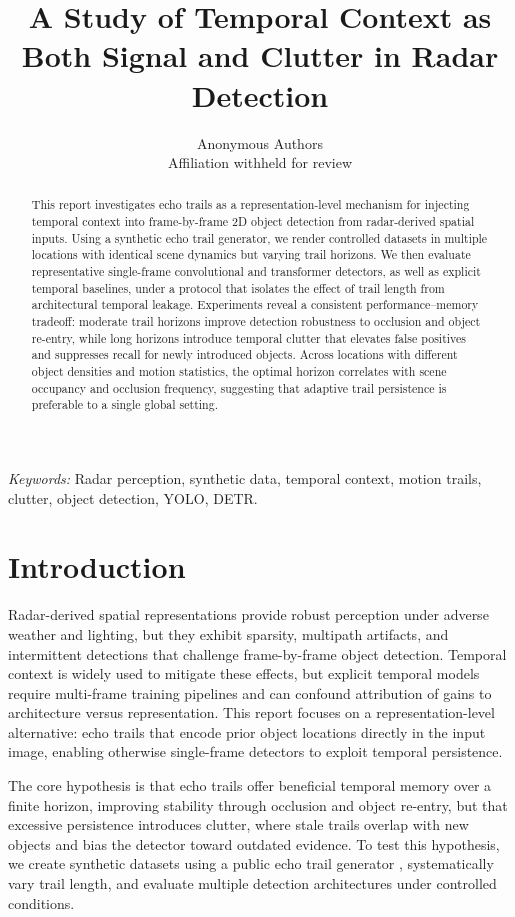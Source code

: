 \documentclass[twocolumn, 10pt]{article}
\title{A Study of Temporal Context as Both Signal and Clutter in Radar Detection}
\author{Anonymous Authors\\
\small Affiliation withheld for review}
\begin{document}
\maketitle

\begin{abstract}
This report investigates echo trails as a representation-level mechanism for injecting temporal context into frame-by-frame 2D object detection from radar-derived spatial inputs. Using a synthetic echo trail generator, we render controlled datasets in multiple locations with identical scene dynamics but varying trail horizons. We then evaluate representative single-frame convolutional and transformer detectors, as well as explicit temporal baselines, under a protocol that isolates the effect of trail length from architectural temporal leakage. Experiments reveal a consistent performance--memory tradeoff: moderate trail horizons improve detection robustness to occlusion and object re-entry, while long horizons introduce temporal clutter that elevates false positives and suppresses recall for newly introduced objects. Across locations with different object densities and motion statistics, the optimal horizon correlates with scene occupancy and occlusion frequency, suggesting that adaptive trail persistence is preferable to a single global setting.
\end{abstract}

\noindent\textit{Keywords:} Radar perception, synthetic data, temporal context, motion trails, clutter, object detection, YOLO, DETR.

\section{Introduction}
Radar-derived spatial representations provide robust perception under adverse weather and lighting, but they exhibit sparsity, multipath artifacts, and intermittent detections that challenge frame-by-frame object detection. Temporal context is widely used to mitigate these effects, but explicit temporal models require multi-frame training pipelines and can confound attribution of gains to architecture versus representation. This report focuses on a representation-level alternative: echo trails that encode prior object locations directly in the input image, enabling otherwise single-frame detectors to exploit temporal persistence.

The core hypothesis is that echo trails offer beneficial temporal memory over a finite horizon, improving stability through occlusion and object re-entry, but that excessive persistence introduces clutter, where stale trails overlap with new objects and bias the detector toward outdated evidence. To test this hypothesis, we create synthetic datasets using a public echo trail generator \cite{RadarEchoTrails}, systematically vary trail length, and evaluate multiple detection architectures under controlled conditions.
\end{document}
